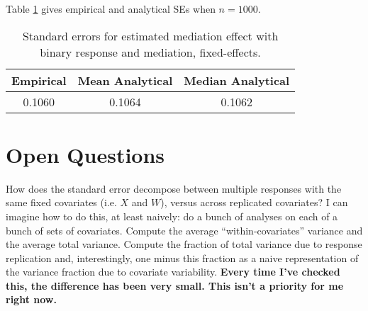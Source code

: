 \documentclass{article}
\begin{document}
Table \ref{tab:SEs_bin_bin_fix} gives empirical and analytical SEs when $n=1000$.

\begin{table}
    \centering
    \begin{tabular}{|c|c|c|}
        \hline
        Empirical & Mean Analytical & Median Analytical\\
        \hline
        0.1060 & 0.1064 & 0.1062\\
        \hline
    \end{tabular}
    \caption{Standard errors for estimated mediation effect with binary response and mediation, fixed-effects.}
    \label{tab:SEs_bin_bin_fix}
\end{table}



\section{Open Questions}

How does the standard error decompose between multiple responses with the same fixed covariates (i.e. $X$ and $W$), versus across replicated covariates? I can imagine how to do this, at least naively: do a bunch of analyses on each of a bunch of sets of covariates. Compute the average ``within-covariates'' variance and the average total variance. Compute the fraction of total variance due to response replication and, interestingly, one minus this fraction as a naive representation of the variance fraction due to covariate variability. \textbf{Every time I've checked this, the difference has been very small. This isn't a priority for me right now.}
\end{document}
